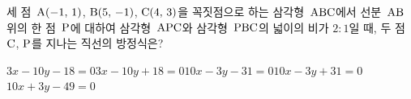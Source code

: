 세 점~$\mathrm{A}(-1,\,1)$, $\mathrm{B}(5,\,-1)$, $\mathrm{C}(4,\,3)$을 꼭짓점으로 하는 삼각형~$\mathrm{ABC}$에서 선분~$\mathrm{AB}$ 위의 한 점~$\mathrm{P}$에 대하여 삼각형~$\mathrm{APC}$와 삼각형~$\mathrm{PBC}$의 넓이의 비가 $2:1$일 때, 두 점~$\mathrm{C}$, $\mathrm{P}$를 지나는 직선의 방정식은?
\begin{choicesii}{$3x-10y-18=0$}{$3x-10y+18=0$}{$10x-3y-31=0$}{$10x-3y+31=0$}{$10x+3y-49=0$}\end{choicesii}
